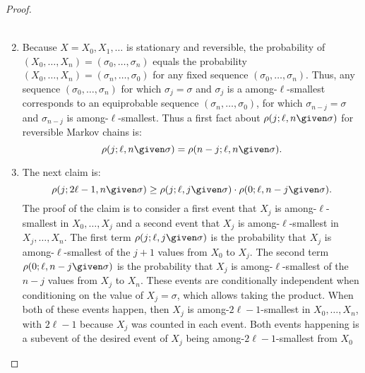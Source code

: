 \documentclass[12pt]{article}
\begin{document}
\begin{proof}
\begin{enumerate}
\begin{multline*}
            \end{multline*}
        \item
            \label{enum:serialsignificance:basethm5} Because \( X = X_0
            , X_1, \dots \) is stationary and reversible, the
            probability of \( (X_0, \dots, X_n ) = (\sigma_0, \dots ,
            \sigma_n ) \) equals the probability \( (X_0,\dots, X_n ) =
            (\sigma_n, \dots, \sigma_0) \) for any fixed sequence \( (\sigma_0,
            \dots, \sigma_n ) \).  Thus, any sequence \( (\sigma_0,\dots,
            \sigma_n ) \) for which \( \sigma_j = \sigma \) and \(
            \sigma_j \) is a among-\( \ell \)-smallest corresponds to an
            equiprobable sequence \( (\sigma_n,\dots, \sigma_0 ) \), for
            which \( \sigma_{n-j} = \sigma \) and \( \sigma_{n-j} \) is
            among-\( \ell \)-smallest.  Thus a first fact about \( \rho(j;
            \ell, n \given \sigma) \) for reversible Markov chains is:
            \[
                \rho(j; \ell, n \given \sigma) = \rho(n-j; \ell, n
                \given \sigma).
            \]
        \item
            \label{enum:serialsignificance:basethm6} The next claim is:
            \[
                \rho(j; 2\ell - 1, n \given \sigma) \ge \rho(j; \ell, j
                \given \sigma) \cdot \rho(0; \ell, n-j \given \sigma).
            \] The proof of the claim is to consider a first event
            that \( X_j \) is among-\( \ell \)-smallest in \( X_0, \dots, X_j \)
            and a second event that \( X_j \) is
            among-\( \ell \)-smallest in \( X_j, \dots, X_n \).
            The first term \( \rho(j; \ell, j
            \given \sigma) \) is the probability that \( X_j \) is
            among-\( \ell \)-smallest of the \( j + 1 \) values from
            \( X_0 \) to \( X_j \).
            The second term \( \rho(0; \ell, n-j
            \given \sigma) \) is the probability that \( X_j \) is
            among-\( \ell \)-smallest of the \( n - j \) values from
            \( X_j \) to \( X_n \).
            These events are conditionally independent when conditioning
            on the value of \( X_j = \sigma \), which allows taking
            the product.
            When both of these events happen, then \(
            X_j \) is among-\( 2\ell -1 \)-smallest in \( X_0, \dots, X_n
            \), with \( 2 \ell -1 \) because \( X_j \) was counted
            in each event.   Both events happening is a subevent of the desired event of \(
            X_j \) being among-\( 2\ell-1 \)-smallest from \( X_0 \)

\end{enumerate}
\end{proof}
\end{document}
